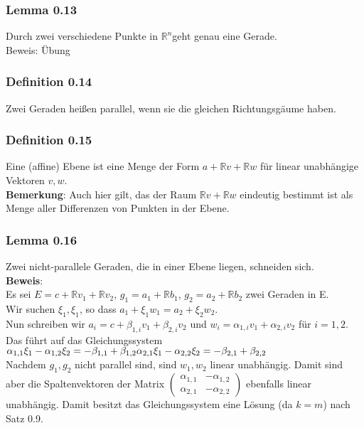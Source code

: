 \documentclass{article}
\newcommand{\R}{\mathbb{R}}
\newcommand{\mRn}{$\mathbb{R}^n$}
\newcommand{\al}{\alpha}
\begin{document}
\subsubsection{Lemma 0.13}
Durch zwei verschiedene Punkte in \mRn geht genau eine Gerade.\\
Beweis: Übung

\subsubsection{Definition 0.14}
Zwei Geraden hei\ss{}en parallel, wenn sie die gleichen Richtungsgäume haben.

\subsubsection{Definition 0.15}
Eine (affine) Ebene ist eine Menge der Form $a + \R v + \R w$ für linear unabhängige Vektoren $v, w$.\\
\textbf{Bemerkung}: Auch hier gilt, das der Raum $\R v + \R w$ eindeutig bestimmt ist als Menge aller Differenzen von Punkten in der Ebene.

\subsubsection{Lemma 0.16}
Zwei nicht-parallele Geraden, die in einer Ebene liegen, schneiden sich.\\
\textbf{Beweis}:\\
Es sei $E = c + \R v_1 + \R v_2$, $g_1 = a_1 + \R b_1$, $g_2 = a_2 + \R b_2$ zwei Geraden in E.\\
Wir suchen $\xi_1, \xi_1$, so dass $a_1 + \xi_1 w_1 = a_2 + \xi_2 w_2$.\\
Nun schreiben wir $a_i = c + \beta_{1,i} v_1 + \beta_{2,i} v_2$ und $w_i = \al_{1,i} v_1 + \al_{2,i} v_2$ für $i =1,2$.\\
Das führt auf das Gleichungssystem\\
$
\al_{1,1} \xi_1 - \al_{1,2} \xi_2 = - \beta_{1,1} + \beta_{1,2}\\
\al_{2,1} \xi_1 - \al_{2,2} \xi_2 = - \beta_{2,1} + \beta_{2,2}\\
$\\
Nachdem $g_1, g_2$ nicht parallel sind, sind $w_1, w_2$ linear unabhängig. Damit sind aber die Spaltenvektoren der Matrix $
\begin{pmatrix}
\al_{1,1} & -\al_{1,2}\\
\al_{2,1} & -\al_{2,2}
\end{pmatrix}
$ ebenfalls linear unabhängig. Damit besitzt das Gleichungssystem eine Lösung (da $k = m$) nach Satz 0.9.
\end{document}
